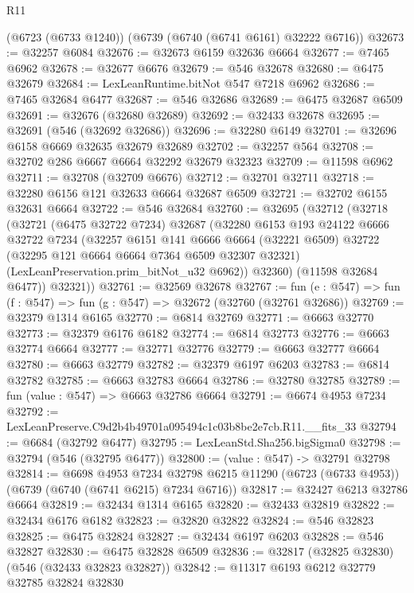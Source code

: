 \begin{lexlean}{R11}
\begin{coremodule}
    (@6723 (@6733 @1240))
    (@6739 (@6740 (@6741 @6161) @32222 @6716))
@32673 := @32257 @6084
@32676 := @32673 @6159 @32636 @6664
@32677 := @7465 @6962
@32678 := @32677 @6676
@32679 := @546 @32678
@32680 := @6475 @32679
@32684 := LexLeanRuntime.bitNot @547 @7218 @6962
@32686 := @7465 @32684 @6477
@32687 := @546 @32686
@32689 := @6475 @32687 @6509
@32691 := @32676 (@32680 @32689)
@32692 := @32433 @32678
@32695 := @32691 (@546 (@32692 @32686))
@32696 := @32280 @6149
@32701 := @32696 @6158 @6669 @32635 @32679 @32689
@32702 := @32257 @564
@32708 := @32702 @286 @6667 @6664 @32292 @32679 @32323
@32709 := @11598 @6962
@32711 := @32708 (@32709 @6676)
@32712 := @32701 @32711
@32718 := @32280 @6156 @121 @32633 @6664 @32687 @6509
@32721 := @32702 @6155 @32631 @6664
@32722 := @546 @32684
@32760 := @32695
    (@32712
      (@32718
        (@32721
          (@6475 @32722 @7234)
          @32687
          (@32280
            @6153
            @193
            @24122
            @6666
            @32722
            @7234
            (@32257
              @6151
              @141
              @6666
              @6664
              (@32221 @6509)
              @32722
              (@32295 @121 @6664 @6664 @7364 @6509 @32307 @32321)
              (LexLeanPreservation.prim_bitNot_u32 @6962))
            @32360)
          (@11598 @32684 @6477))
        @32321))
@32761 := @32569 @32678
@32767 := fun (e : @547) => fun (f : @547) => fun (g : @547) => @32672 (@32760 (@32761 @32686))
@32769 := @32379 @1314 @6165
@32770 := @6814 @32769
@32771 := @6663 @32770
@32773 := @32379 @6176 @6182
@32774 := @6814 @32773
@32776 := @6663 @32774 @6664
@32777 := @32771 @32776
@32779 := @6663 @32777 @6664
@32780 := @6663 @32779
@32782 := @32379 @6197 @6203
@32783 := @6814 @32782
@32785 := @6663 @32783 @6664
@32786 := @32780 @32785
@32789 := fun (value : @547) => @6663 @32786 @6664
@32791 := @6674 @4953 @7234
@32792 := LexLeanPreserve.C9d2b4b49701a095494c1c03b8be2e7cb.R11.__fits_33
@32794 := @6684 (@32792 @6477)
@32795 := LexLeanStd.Sha256.bigSigma0
@32798 := @32794 (@546 (@32795 @6477))
@32800 := (value : @547) -> @32791 @32798
@32814 := @6698
    @4953
    @7234
    @32798
    @6215
    @11290
    (@6723 (@6733 @4953))
    (@6739 (@6740 (@6741 @6215) @7234 @6716))
@32817 := @32427 @6213 @32786 @6664
@32819 := @32434 @1314 @6165
@32820 := @32433 @32819
@32822 := @32434 @6176 @6182
@32823 := @32820 @32822
@32824 := @546 @32823
@32825 := @6475 @32824
@32827 := @32434 @6197 @6203
@32828 := @546 @32827
@32830 := @6475 @32828 @6509
@32836 := @32817 (@32825 @32830) (@546 (@32433 @32823 @32827))
@32842 := @11317 @6193 @6212 @32779 @32785 @32824 @32830

\end{coremodule}
\end{lexlean}
